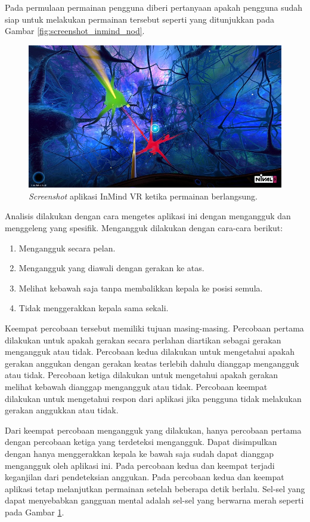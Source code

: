 Pada permulaan permainan pengguna diberi pertanyaan apakah pengguna sudah siap untuk melakukan permainan tersebut seperti yang ditunjukkan pada Gambar \ref{fig:screenshot_inmind_nod}.

\begin{figure}[htbp]
\centering
\includegraphics[scale=0.7]{Gambar/screenshot-inmind-gameplay.jpg}
\caption{\textit{Screenshot} aplikasi InMind VR ketika permainan berlangsung.}
\label{fig:screenshot_inmind_gameplay}
\end{figure}

Analisis dilakukan dengan cara mengetes aplikasi ini dengan mengangguk dan menggeleng yang spesifik. Mengangguk dilakukan dengan cara-cara berikut:
\begin{enumerate}
	\item Mengangguk secara pelan.
	\item Mengangguk yang diawali dengan gerakan ke atas.
	\item Melihat kebawah saja tanpa membalikkan kepala ke posisi semula.
	\item Tidak menggerakkan kepala sama sekali.
\end{enumerate}

Keempat percobaan tersebut memiliki tujuan masing-masing. Percobaan pertama dilakukan untuk apakah gerakan secara perlahan diartikan sebagai gerakan mengangguk atau tidak. Percobaan kedua dilakukan untuk mengetahui apakah gerakan anggukan dengan gerakan keatas terlebih dahulu dianggap mengangguk atau tidak. Percobaan ketiga dilakukan untuk mengetahui apakah gerakan melihat kebawah dianggap mengangguk atau tidak. Percobaan keempat dilakukan untuk mengetahui respon dari aplikasi jika pengguna tidak melakukan gerakan anggukkan atau tidak. 

Dari keempat percobaan mengangguk yang dilakukan, hanya percobaan pertama dengan percobaan ketiga yang terdeteksi mengangguk. Dapat disimpulkan dengan hanya menggerakkan kepala ke bawah saja sudah dapat dianggap mengangguk oleh aplikasi ini. Pada percobaan kedua dan keempat terjadi keganjilan dari pendeteksian anggukan. Pada percobaan kedua dan keempat aplikasi tetap melanjutkan permainan setelah beberapa detik berlalu. Sel-sel yang dapat menyebabkan gangguan mental adalah sel-sel yang berwarna merah seperti pada Gambar \ref{fig:screenshot_inmind_gameplay}. 


